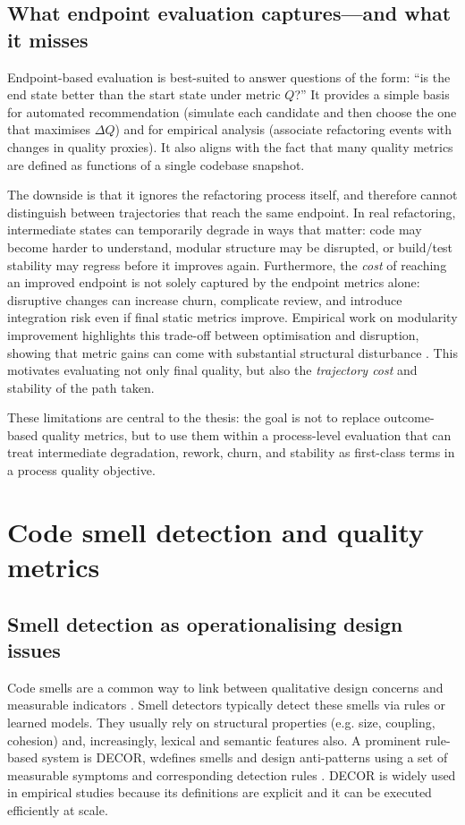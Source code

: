\subsection{What endpoint evaluation captures---and what it misses}
Endpoint-based evaluation is best-suited to answer questions of the form: ``is the end state better than the start state under metric $Q$?'' It provides a simple basis for automated recommendation (simulate each candidate and then choose the one that maximises $\Delta Q$) and for empirical analysis (associate refactoring events with changes in quality proxies). It also aligns with the fact that many quality metrics are defined as functions of a single codebase snapshot.

The downside is that it ignores the refactoring process itself, and therefore cannot distinguish between trajectories that reach the same endpoint. In real refactoring, intermediate states can temporarily degrade in ways that matter: code may become harder to understand, modular structure may be disrupted, or build/test stability may regress before it improves again. Furthermore, the \emph{cost} of reaching an improved endpoint is not solely captured by the endpoint metrics alone: disruptive changes can increase churn, complicate review, and introduce integration risk even if final static metrics improve. Empirical work on modularity improvement highlights this trade-off between optimisation and disruption, showing that metric gains can come with substantial structural disturbance \cite{paixao2017balancing}. This motivates evaluating not only final quality, but also the \emph{trajectory cost} and stability of the path taken.

These limitations are central to the thesis: the goal is not to replace outcome-based quality metrics, but to use them within a process-level evaluation that can treat intermediate degradation, rework, churn, and stability as first-class terms in a process quality objective.

\section{Code smell detection and quality metrics}
\label{sec:smells-metrics}

\subsection{Smell detection as operationalising design issues}
Code smells are a common way to link between qualitative design concerns and measurable indicators \cite{fowler1999refactoring}. Smell detectors typically detect these smells via rules or learned models. They usually rely on structural properties (e.g. size, coupling, cohesion) and, increasingly, lexical and semantic features also. A prominent rule-based system is DECOR, wdefines smells and design anti-patterns using a set of measurable symptoms and corresponding detection rules \cite{moha2010decor}. DECOR is widely used in empirical studies because its definitions are explicit and it can be executed efficiently at scale.

